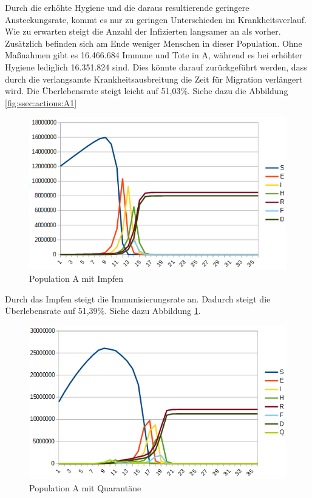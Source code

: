   Durch die erhöhte Hygiene und die daraus resultierende geringere Ansteckungsrate, kommt es nur zu geringen Unterschieden im Krankheitsverlauf. Wie zu erwarten steigt die Anzahl der Infizierten langsamer an als vorher. Zusätzlich befinden sich am Ende weniger Menschen in dieser Population. Ohne Maßnahmen gibt es 16.466.684 Immune und Tote in A, während es bei erhöhter Hygiene lediglich 16.351.824 sind. Dies könnte darauf zurückgeführt werden, dass durch die verlangsamte Krankheitsausbreitung die Zeit für Migration verlängert wird. Die Überlebensrate steigt leicht auf 51,03\%. Siehe dazu die Abbildung \ref{fig:ssec:actions:A1}\\
 \begin{figure}
 \includegraphics[width=1\textwidth]{massnahmen/A2}
\caption{Population A mit Impfen}
\label{fig:ssec:actions:A2}
\end{figure}
  Durch das Impfen steigt die Immunisierungsrate an. Dadurch steigt die Überlebensrate auf 51,39\%. Siehe dazu Abbildung \ref{fig:ssec:actions:A2}.\\
  \begin{figure}
 \includegraphics[width=1\textwidth]{massnahmen/A3}
\caption{Population A mit Quarantäne}
\label{fig:ssec:actions:A3}
\end{figure}
